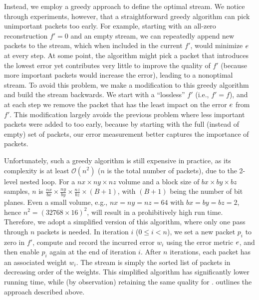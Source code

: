 Instead, we employ a greedy approach to define the optimal stream. We notice through experiments,
however, that a straightforward greedy algorithm can pick unimportant packets too early. For
example, starting with an all-zero reconstruction $f'=0$ and an empty stream, we can repeatedly
append new packets to the stream, which when included in the current $f'$, would minimize $e$ at
every step. At some point, the algorithm might pick a packet that introduces the lowest error yet
contributes very little to improve the quality of $f'$ (because more important packets would
increase the error), leading to a nonoptimal stream. To avoid this problem, we make a modification
to this greedy algorithm and build the stream backwards. We start with a ``lossless'' $f'$ (i.e.,
$f'=f$), and at each step we remove the packet that has the least impact on the error $e$ from
$f'$. This modification largely avoids the previous problem where less important packets were added
to \sopt too early, because by starting with the full (instead of empty) set of packets, our error
measurement better captures the importance of packets.

Unfortunately, such a greedy algorithm is still expensive in practice, as its complexity is at least
$\mathcal{O}(n^2)$ ($n$ is the total number of packets), due to the 2-level nested loop. For a
$nx\times ny \times nz$ volume and a block size of $bx\times by\times bz$ samples, $n$ is
$\frac{nx}{bx}\times \frac{ny}{by}\times \frac{nz}{bz} \times (B+1)$, with $(B+1)$ being the number
of bit planes. Even a small volume, e.g., $nx=ny=nz=64$ with $bx=by=bz=2$, hence $n^2=(32768\times
16)^2$, will result in a prohibitively high run time. Therefore, we adopt a simplified version of
this algorithm, where only one pass through $n$ packets is needed. In iteration $i$ ($0\leq i < n$),
we set a new packet $p_i$ to zero in $f'$, compute and record the incurred error $w_i$ using the
error metric $e$, and then enable $p_i$ again at the end of iteration $i$. After $n$ iterations,
each packet has an associated weight $w_i$. The stream \sopt is simply the sorted list of packets in
decreasing order of the weights. This simplified algorithm has significantly lower running time,
while (by observation) retaining the same quality for \sopt.  outlines the approach
described above.

